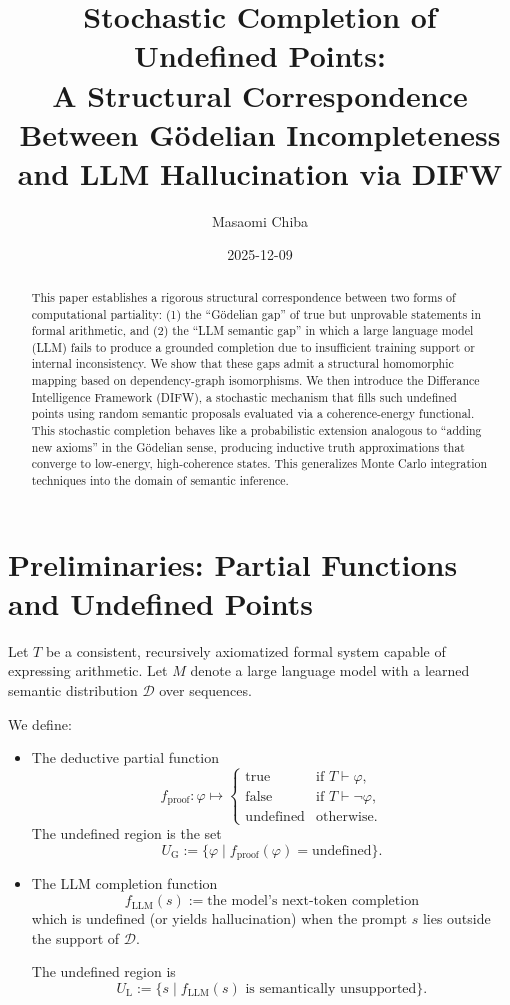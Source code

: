 \documentclass{article}
\title{Stochastic Completion of Undefined Points:\\
A Structural Correspondence Between G\"odelian Incompleteness 
and LLM Hallucination via DIFW}
\author{Masaomi Chiba}
\date{2025-12-09}
\begin{document}
\maketitle

\begin{abstract}
This paper establishes a rigorous structural correspondence between two
forms of computational partiality: (1) the ``G\"odelian gap'' of true
but unprovable statements in formal arithmetic, and (2) the ``LLM
semantic gap'' in which a large language model (LLM) fails to produce a
grounded completion due to insufficient training support or internal
inconsistency.  
We show that these gaps admit a structural homomorphic mapping based on
dependency-graph isomorphisms.  
We then introduce the Differance Intelligence Framework (DIFW), a
stochastic mechanism that fills such undefined points using random
semantic proposals evaluated via a coherence-energy functional.  
This stochastic completion behaves like a probabilistic extension
analogous to ``adding new axioms'' in the G\"odelian sense, producing
inductive truth approximations that converge to low-energy, high-coherence
states.  
This generalizes Monte Carlo integration techniques into the domain of
semantic inference.
\end{abstract}

\section{Preliminaries: Partial Functions and Undefined Points}

Let $T$ be a consistent, recursively axiomatized formal system capable of
expressing arithmetic.  
Let $M$ denote a large language model with a learned semantic
distribution $\mathcal{D}$ over sequences.

We define:

\begin{itemize}
    \item The deductive partial function
    \[
        f_{\mathrm{proof}} : \varphi \mapsto 
        \begin{cases}
            \text{true} & \text{if $T \vdash \varphi$,} \\
            \text{false} & \text{if $T \vdash \neg\varphi$,} \\
            \text{undefined} & \text{otherwise.}
        \end{cases}
    \]
    The undefined region is the set 
    \[
        U_{\mathrm{G}} := \{ \varphi \mid 
        f_{\mathrm{proof}}(\varphi) = \text{undefined} \}.
    \]

    \item The LLM completion function
    \[
        f_{\mathrm{LLM}}(s) := \text{the model's next-token completion}
    \]
    which is undefined (or yields hallucination) when the prompt $s$
    lies outside the support of $\mathcal{D}$.

    The undefined region is
    \[
        U_{\mathrm{L}} := 
        \{ s \mid f_{\mathrm{LLM}}(s) \text{ is semantically unsupported} \}.
    \]
\end{itemize}
\end{document}
